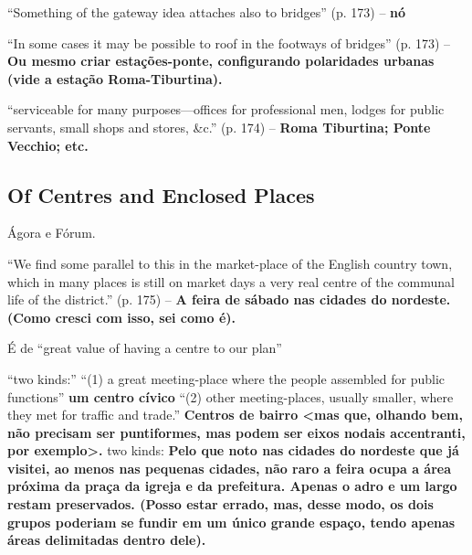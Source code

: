 \documentclass[12pt, a4paper]{book} %
\begin{document}
        ``Something of the gateway idea attaches also to bridges'' (p. 173) – \textbf{nó}

        ``In some cases it may be possible to roof in the footways of bridges'' (p. 173) – \textbf{Ou mesmo criar estações-ponte, configurando polaridades urbanas (vide a estação Roma-Tiburtina).}

        ``serviceable for many purposes—offices for professional men, lodges for public servants, small shops and stores, &c.'' (p. 174) – \textbf{Roma Tiburtina; Ponte Vecchio; etc.}

        \subsection*{Of Centres and Enclosed Places}

        Ágora e Fórum.

        ``We find some parallel to this in the market-place of the English country town, which in many places is still on market days a very real centre of the communal life of the district.'' (p. 175) – \textbf{A feira de sábado nas cidades do nordeste. (Como cresci com isso, sei como é).}

        É de ``great value of having a centre to our plan''

        ``two kinds:''
        ``(1) a great meeting-place where the people assembled for public functions'' \textbf{um centro cívico}
        ``(2) other meeting-places, usually smaller, where they met for traffic and trade.'' \textbf{Centros de bairro <mas que, olhando bem, não precisam ser puntiformes, mas podem ser eixos nodais accentranti, por exemplo>.} 
        two kinds: \textbf{Pelo que noto nas cidades do nordeste que já visitei, ao menos nas pequenas cidades, não raro a feira ocupa a área próxima da praça da igreja e da prefeitura. Apenas o adro e um largo restam preservados. (Posso estar errado, mas, desse modo, os dois grupos poderiam se fundir em um único grande espaço, tendo apenas áreas delimitadas dentro dele).} 
\end{document}
